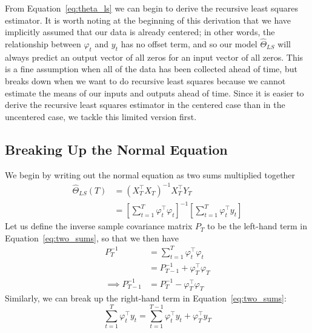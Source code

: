 From Equation~\ref{eq:theta_ls} we can begin to derive the recursive least
squares estimator. It is worth noting at the beginning of this derivation that
we have implicitly assumed that our data is already centered; in other words,
the relationship between $\varphi_t$ and $y_t$ has no offset term, and so our
model $\hat\Theta_{LS}$ will always predict an output vector of all zeros for
an input vector of all zeros. This is a fine assumption when all of the data
has been collected ahead of time, but breaks down when we want to do recursive
least squares because we cannot estimate the means of our inputs and outputs
ahead of time. Since it is easier to derive the recursive least squares
estimator in the centered case than in the uncentered case, we tackle this
limited version first. 

\subsection{Breaking Up the Normal Equation}
We begin by writing out the normal equation as two sums multiplied together
\begin{align}
  \hat\Theta_{LS}(T) &= (X_T^\top X_T)^{-1} X_T^\top Y_T \\
                  &= \left[\sum_{t=1}^T \varphi_t^\top \varphi_t\right]^{-1} \left[\sum_{t=1}^T\varphi_t^\top y_t \right] \label{eq:two_sums}
\end{align}
Let us define the inverse sample covariance matrix $P_T$ to be the left-hand
term in Equation~\ref{eq:two_sums}, so that we then have
\begin{align}
  \label{eq:sample_covar_split}
  P_T^{-1} &= \sum_{t=1}^T \varphi_t^\top \varphi_t \\
           &= P_{T - 1}^{-1} + \varphi_T^\top \varphi_T \label{eq:p_inv_update}\\
  \implies P_{T - 1}^{-1} &= P_T^{-1} - \varphi_T^\top \varphi_T \label{eq:sub_covar}
\end{align}
Similarly, we can break up the right-hand term in Equation~\ref{eq:two_sums}:
\begin{equation}
  \sum_{t=1}^T\varphi_t^\top y_t = \sum_{t=1}^{T-1} \varphi_t^\top y_t + \varphi_T^\top y_T
\end{equation}

